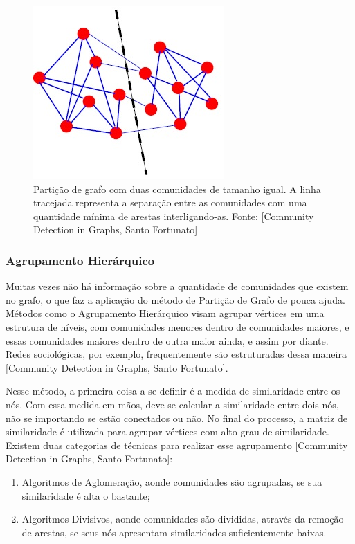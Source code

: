 \documentclass[xindy,rascunho]{fei}
\begin{document}
\begin{figure}
\centering
\includegraphics[width=0.7\linewidth]{./Imagens_Monografia/Community_Detection_in_Graphs_-_Santo_Fortunato(Particionamento_Grafos).jpg}
\caption{Partição de grafo com duas comunidades de tamanho igual. A linha tracejada representa a separação entre as comunidades com uma quantidade mínima de arestas interligando-as. 
Fonte: [Community Detection in Graphs, Santo Fortunato]}
\label{fig:ParticaoDeGrafo}
\end{figure}

\subsubsection{Agrupamento Hierárquico}
Muitas vezes não há informação sobre a quantidade de comunidades que existem no grafo, o que faz a aplicação do método de Partição de Grafo de pouca ajuda. Métodos como o Agrupamento Hierárquico visam agrupar vértices em uma estrutura de níveis, com comunidades menores dentro de comunidades maiores, e essas comunidades maiores dentro de outra maior ainda, e assim por diante. Redes sociológicas, por exemplo, frequentemente são estruturadas dessa maneira [Community Detection in Graphs, Santo Fortunato].

Nesse método, a primeira coisa a se definir é a medida de similaridade entre os nós. Com essa medida em mãos, deve-se calcular a similaridade entre dois nós, não se importando se estão conectados ou não. No final do processo, a matriz de similaridade é utilizada para agrupar vértices com alto grau de similaridade. Existem duas categorias de técnicas para realizar esse agrupamento [Community Detection in Graphs, Santo Fortunato]:
\begin{enumerate}
	\item Algoritmos de Aglomeração, aonde comunidades são agrupadas, se sua similaridade é alta o bastante;
	\item Algoritmos Divisivos, aonde comunidades são divididas, através da remoção de arestas, se seus nós apresentam similaridades suficientemente baixas.
\end{enumerate}
\end{document}
